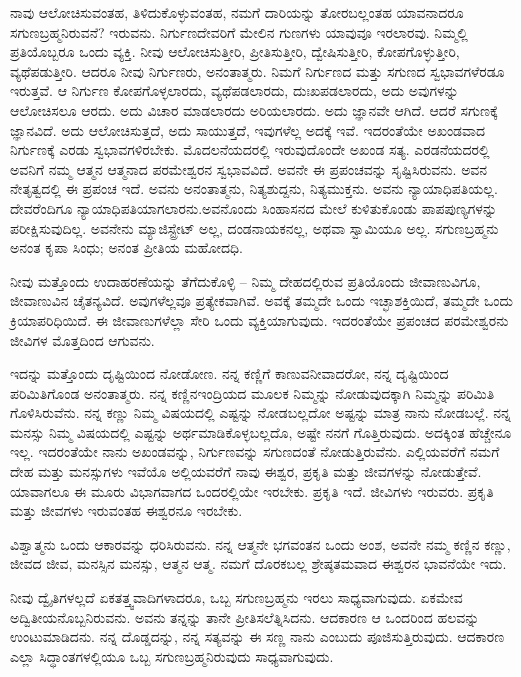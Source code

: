 ನಾವು ಆಲೋಚಿಸುವಂತಹ, ತಿಳಿದುಕೊಳ್ಳುವಂತಹ, ನಮಗೆ ದಾರಿಯನ್ನು ತೋರಬಲ್ಲಂತಹ ಯಾವನಾದರೂ ಸಗುಣಬ್ರಹ್ಮನಿರುವನೆ? ಇರುವನು. ನಿರ್ಗುಣದೇವರಿಗೆ ಮೇಲಿನ ಗುಣಗಳು ಯಾವುವೂ ಇರಲಾರವು. ನಿಮ್ಮಲ್ಲಿ ಪ್ರತಿಯೊಬ್ಬರೂ ಒಂದು ವ್ಯಕ್ತಿ. ನೀವು ಆಲೋಚಿಸುತ್ತೀರಿ, ಪ್ರೀತಿಸುತ್ತೀರಿ, ದ್ವೇಷಿಸುತ್ತೀರಿ, ಕೋಪಗೊಳ್ಳುತ್ತೀರಿ, ವ್ಯಥೆಪಡುತ್ತೀರಿ. ಆದರೂ ನೀವು ನಿರ್ಗುಣರು, ಅನಂತಾತ್ಮರು. ನಿಮಗೆ ನಿರ್ಗುಣದ ಮತ್ತು ಸಗುಣದ ಸ್ವಭಾವಗಳೆರಡೂ ಇರುತ್ತವೆ. ಆ ನಿರ್ಗುಣ ಕೋಪಗೊಳ್ಳಲಾರದು, ವ್ಯಥೆಪಡಲಾರದು, ದುಃಖಪಡಲಾರದು, ಅದು ಅವುಗಳನ್ನು ಆಲೋಚಿಸಲೂ ಆರದು. ಅದು ವಿಚಾರ ಮಾಡಲಾರದು ಅರಿಯಲಾರದು. ಅದು ಜ್ಞಾನವೇ ಆಗಿದೆ. ಆದರೆ ಸಗುಣಕ್ಕೆ ಜ್ಞಾನವಿದೆ. ಅದು ಆಲೋಚಿಸುತ್ತದೆ, ಅದು ಸಾಯುತ್ತದೆ, ಇವುಗಳೆಲ್ಲ ಅದಕ್ಕೆ ಇವೆ. ಇದರಂತೆಯೇ ಅಖಂಡವಾದ ನಿರ್ಗುಣಕ್ಕೆ ಎರಡು ಸ್ವಭಾವಗಳಿರಬೇಕು. ಮೊದಲನೆಯದರಲ್ಲಿ ಇರುವುದೊಂದೇ ಅಖಂಡ ಸತ್ಯ. ಎರಡನೆಯದರಲ್ಲಿ ಅವನಿಗೆ ನಮ್ಮ ಆತ್ಮನ ಆತ್ಮನಾದ ಪರಮೇಶ್ವರನ ಸ್ವಭಾವವಿದೆ. ಅವನೇ ಈ ಪ್ರಪಂಚವನ್ನು ಸೃಷ್ಟಿಸಿರುವನು. ಅವನ ನೇತೃತ್ವದಲ್ಲಿ ಈ ಪ್ರಪಂಚ ಇದೆ. ಅವನು ಅನಂತಾತ್ಮನು, ನಿತ್ಯಶುದ್ದನು, ನಿತ್ಯಮುಕ್ತನು. ಅವನು ನ್ಯಾಯಾಧಿಪತಿಯಲ್ಲ. ದೇವರೆಂದಿಗೂ ನ್ಯಾಯಾಧಿಪತಿಯಾಗಲಾರನು.\break ಅವನೊಂದು ಸಿಂಹಾಸನದ ಮೇಲೆ ಕುಳಿತುಕೊಂಡು ಪಾಪಪುಣ್ಯಗಳನ್ನು ಪರೀಕ್ಷಿಸುವುದಿಲ್ಲ. ಅವನೇನು ಮ್ಯಾಜಿಸ್ಟ್ರೇಟ್ ಅಲ್ಲ, ದಂಡನಾಯಕನಲ್ಲ, ಅಥವಾ ಸ್ವಾಮಿಯೂ ಅಲ್ಲ. ಸಗುಣಬ್ರಹ್ಮನು ಅನಂತ ಕೃಪಾ ಸಿಂಧು; ಅನಂತ ಪ್ರೀತಿಯ ಮಹೋದಧಿ.

ನೀವು ಮತ್ತೊಂದು ಉದಾಹರಣೆಯನ್ನು ತೆಗೆದುಕೊಳ್ಳಿ – ನಿಮ್ಮ ದೇಹದಲ್ಲಿರುವ ಪ್ರತಿಯೊಂದು ಜೀವಾಣುವಿಗೂ, ಜೀವಾಣುವಿನ ಚೈತನ್ಯವಿದೆ. ಅವುಗಳೆಲ್ಲವೂ ಪ್ರತ್ಯೇಕವಾಗಿವೆ. ಅವಕ್ಕೆ ತಮ್ಮದೇ ಒಂದು ಇಚ್ಛಾಶಕ್ತಿಯಿದೆ, ತಮ್ಮದೇ ಒಂದು ಕ್ರಿಯಾಪರಿಧಿಯಿದೆ. ಈ ಜೀವಾಣುಗಳೆಲ್ಲಾ ಸೇರಿ ಒಂದು ವ್ಯಕ್ತಿಯಾಗುವುದು. ಇದರಂತೆಯೇ ಪ್ರಪಂಚದ ಪರಮೇಶ್ವರನು ಜೀವಿಗಳ ಮೊತ್ತದಿಂದ ಆಗುವನು.

\newpage

ಇದನ್ನು ಮತ್ತೊಂದು ದೃಷ್ಟಿಯಿಂದ ನೋಡೋಣ. ನನ್ನ ಕಣ್ಣಿಗೆ ಕಾಣುವ\break ನೀವಾದರೋ, ನನ್ನ ದೃಷ್ಟಿಯಿಂದ ಪರಿಮಿತಿಗೊಂಡ ಅನಂತಾತ್ಮರು. ನನ್ನ ಕಣ್ಣಿನ\break ಇಂದ್ರಿಯದ ಮೂಲಕ ನಿಮ್ಮನ್ನು ನೋಡುವುದಕ್ಕಾಗಿ ನಿಮ್ಮನ್ನು ಪರಿಮಿತಿ ಗೊಳಿಸಿರುವೆನು. ನನ್ನ ಕಣ್ಣು ನಿಮ್ಮ ವಿಷಯದಲ್ಲಿ ಎಷ್ಟನ್ನು ನೋಡಬಲ್ಲದೋ ಅಷ್ಟನ್ನು ಮಾತ್ರ ನಾನು ನೋಡಬಲ್ಲೆ. ನನ್ನ ಮನಸ್ಸು ನಿಮ್ಮ ವಿಷಯದಲ್ಲಿ ಎಷ್ಟನ್ನು ಅರ್ಥಮಾಡಿಕೊಳ್ಳಬಲ್ಲದೊ, ಅಷ್ಟೇ ನನಗೆ ಗೊತ್ತಿರುವುದು. ಅದಕ್ಕಿಂತ ಹೆಚ್ಚೇನೂ ಇಲ್ಲ. ಇದರಂತೆಯೇ ನಾನು ಅಖಂಡವನ್ನು, ನಿರ್ಗುಣವನ್ನು ಸಗುಣದಂತೆ ನೋಡುತ್ತಿರುವೆನು. ಎಲ್ಲಿಯವರೆಗೆ ನಮಗೆ ದೇಹ ಮತ್ತು ಮನಸ್ಸುಗಳು ಇವೆಯೊ ಅಲ್ಲಿಯವರೆಗೆ ನಾವು ಈಶ್ವರ, ಪ್ರಕೃತಿ ಮತ್ತು ಜೀವಗಳನ್ನು ನೋಡುತ್ತೇವೆ. ಯಾವಾಗಲೂ ಈ ಮೂರು ವಿಭಾಗವಾಗದ ಒಂದರಲ್ಲಿಯೇ ಇರಬೇಕು. ಪ್ರಕೃತಿ ಇದೆ. ಜೀವಿಗಳು ಇರುವರು. ಪ್ರಕೃತಿ ಮತ್ತು ಜೀವಗಳು ಇರುವಂತಹ ಈಶ್ವರನೂ ಇರಬೇಕು.

\vskip 2pt

ವಿಶ್ವಾತ್ಮನು ಒಂದು ಆಕಾರವನ್ನು ಧರಿಸಿರುವನು. ನನ್ನ ಆತ್ಮನೇ ಭಗವಂತನ ಒಂದು ಅಂಶ, ಅವನೇ ನಮ್ಮ ಕಣ್ಣಿನ ಕಣ್ಣು, ಜೀವದ ಜೀವ, ಮನಸ್ಸಿನ ಮನಸ್ಸು, ಆತ್ಮನ ಆತ್ಮ. ನಮಗೆ ದೊರಕಬಲ್ಲ ಶ್ರೇಷ್ಠತಮವಾದ ಈಶ್ವರನ ಭಾವನೆಯೇ ಇದು.

\vskip 2pt

ನೀವು ದ್ವೈತಿಗಳಲ್ಲದೆ ಏಕತತ್ತ್ವವಾದಿಗಳಾದರೂ, ಒಬ್ಬ ಸಗುಣಬ್ರಹ್ಮನು ಇರಲು ಸಾಧ್ಯವಾಗುವುದು. ಏಕಮೇವ ಅದ್ವಿತೀಯನೊಬ್ಬನಿರುವನು. ಅವನು ತನ್ನನ್ನು ತಾನೇ ಪ್ರೀತಿಸಲೆತ್ನಿಸಿದನು. ಆದಕಾರಣ ಆ ಒಂದರಿಂದ ಹಲವನ್ನು ಉಂಟುಮಾಡಿದನು. ನನ್ನ ದೊಡ್ಡದನ್ನು, ನನ್ನ ಸತ್ಯವನ್ನು ಈ ಸಣ್ಣ ನಾನು ಎಂಬುದು ಪೂಜಿಸುತ್ತಿರುವುದು. ಆದಕಾರಣ ಎಲ್ಲಾ ಸಿದ್ಧಾಂತಗಳಲ್ಲಿಯೂ ಒಬ್ಬ ಸಗುಣಬ್ರಹ್ಮನಿರುವುದು ಸಾಧ್ಯವಾಗುವುದು.

